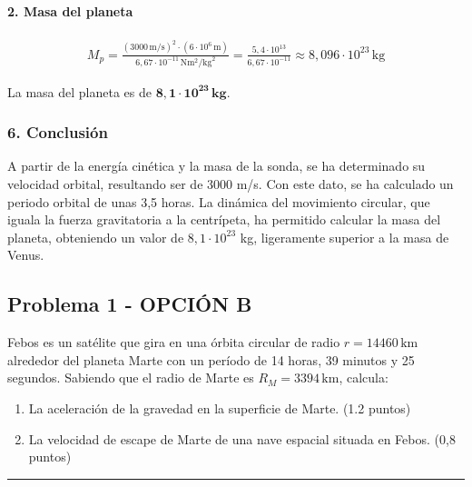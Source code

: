 \paragraph{2. Masa del planeta}
\begin{gather}
    M_p = \frac{(3000\,\text{m/s})^2 \cdot (6 \cdot 10^6\,\text{m})}{6,67 \cdot 10^{-11}\,\text{N}\text{m}^2/\text{kg}^2} = \frac{5,4 \cdot 10^{13}}{6,67 \cdot 10^{-11}} \approx 8,096 \cdot 10^{23}\,\text{kg}
\end{gather}
\begin{cajaresultado}
La masa del planeta es de $\boldsymbol{8,1 \cdot 10^{23}\,\textbf{kg}}$.
\end{cajaresultado}

\subsubsection*{6. Conclusión}
\begin{cajaconclusion}
A partir de la energía cinética y la masa de la sonda, se ha determinado su velocidad orbital, resultando ser de 3000 m/s. Con este dato, se ha calculado un periodo orbital de unas 3,5 horas. La dinámica del movimiento circular, que iguala la fuerza gravitatoria a la centrípeta, ha permitido calcular la masa del planeta, obteniendo un valor de $8,1 \cdot 10^{23}$ kg, ligeramente superior a la masa de Venus.
\end{cajaconclusion}

\newpage

\subsection{Problema 1 - OPCIÓN B}
\label{subsec:1B_2006_jun_ord}

\begin{cajaenunciado}
Febos es un satélite que gira en una órbita circular de radio $r = 14460\,\text{km}$ alrededor del planeta Marte con un período de 14 horas, 39 minutos y 25 segundos. Sabiendo que el radio de Marte es $R_M = 3394\,\text{km}$, calcula:
\begin{enumerate}
    \item La aceleración de la gravedad en la superficie de Marte. (1.2 puntos)
    \item La velocidad de escape de Marte de una nave espacial situada en Febos. (0,8 puntos)
\end{enumerate}
\end{cajaenunciado}
\hrule

